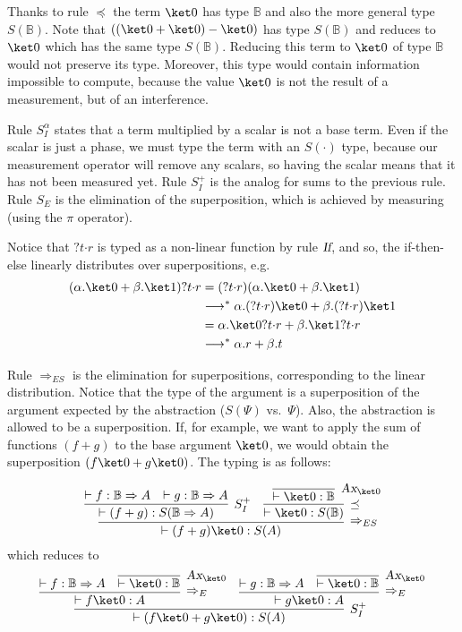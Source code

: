 \documentclass[preprint]{elsarticle}
\newcommand\B{\ensuremath{\mathbb B}}
\newcommand\gB{\ensuremath{\Psi}}
\newcommand\ite[3]{{#1}?{#2}\mathord{\cdot}{#3}}
\newcommand\pair[2]{({#1}+{#2})}
\newcommand\npair[2]{({#1}-{#2})}
\newcommand\tax{\textsl{Ax}}
\newcommand\tif{\textsl{If}}
\begin{document}
Thanks to rule $\preceq$ the term $\ket 0$ has type $\B$ and also the more
general type $S(\B)$. Note that $\npair{\pair{\ket 0}{\ket 0}}{\ket 0}$ has type
$S(\B)$ and reduces to $\ket 0$ which has the same type $S(\B)$. Reducing this
term to $\ket 0$ of type $\B$ would not preserve its type. Moreover, this type
would contain information impossible to compute, because the value $\ket 0$ is
not the result of a measurement, but of an interference.

Rule $S_I^\alpha$ states that a term multiplied by a scalar is not a base term.
Even if the scalar is just a phase, we must type the term with an $S(\cdot)$
type, because our measurement operator will remove any scalars, so having the
scalar means that it has not been measured yet. Rule $S_I^+$ is the analog for
sums to the previous rule. Rule $S_E$ is the elimination of the superposition,
which is achieved by measuring (using the $\pi$ operator).

Notice that $\ite{}tr$ is typed as a non-linear function by rule $\tif$, and so,
the if-then-else linearly distributes over superpositions, e.g.
\begin{align*}
  \ite{(\alpha.\ket 0+\beta.\ket 1)}tr &= (\ite{}tr)(\alpha.\ket 0+\beta.\ket 1)\\
                                       &\longrightarrow^* \alpha.(\ite{}tr)\ket 0+\beta.(\ite{}tr)\ket 1\\
                                       &=\alpha.\ite{\ket 0}tr+\beta.\ite{\ket 1}tr\\
                                       &\longrightarrow^*\alpha.r+\beta.t
\end{align*}

Rule $\Rightarrow_{ES}$ is the elimination for superpositions, corresponding to
the linear distribution. Notice that the type of the argument is a superposition
of the argument expected by the abstraction ($S(\gB)$ vs.~$\gB$). Also, the
abstraction is allowed to be a superposition. If, for example, we want to apply
the sum of functions $\pair fg$ to the base argument $\ket 0$, we would obtain
the superposition $\pair{f\ket 0}{g\ket 0}$. The typing is as follows:

\[
  \infer[\Rightarrow_{ES}] {\vdash\pair fg\ket 0:S(A)} { \infer[S_I^+]
    {\vdash\pair fg:S(\B\Rightarrow A)} {\vdash f:\B\Rightarrow A & \vdash
      g:\B\Rightarrow A} & \infer[\preceq] {\vdash\ket 0:S(\B)}
    {\infer[\tax_{\ket 0}] {\vdash\ket 0:\B}{}} }
\]
which reduces to
\[
  \infer[S_I^+] {\vdash\pair{f\ket 0}{g\ket 0}:S(A)} { \infer[\Rightarrow_E]
    {\vdash f\ket 0:A} { \vdash f:\B\Rightarrow A & \infer[\tax_{\ket 0}]
      {\vdash\ket 0:\B}{} } & \infer[\Rightarrow_E] {\vdash g\ket 0:A} {\vdash
      g:\B\Rightarrow A & \infer[\tax_{\ket 0}] {\vdash\ket 0:\B}{}} }
\]
\end{document}
